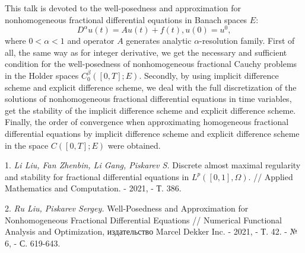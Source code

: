 




\vzmscaption



This talk is devoted to  the  well-posedness and approximation for nonhomogeneous
fractional differential equations in Banach spaces $E:$
$$ D^\alpha u(t) = A u(t) + f(t), u(0)= u^0, $$
where $0 < \alpha <1$ and operator $A$ generates analytic $\alpha$-resolution family.
 First of all, the same way
as for integer derivative, we get the necessary and sufficient condition for the
well-posedness of   nonhomogeneous fractional Cauchy problems in the Holder spaces
$C^\beta_0([0,T];E).$ Secondly, by using implicit difference scheme and
explicit  difference scheme, we deal with the full discretization of the solutions
of nonhomogeneous fractional differential equations in time variables, get the  stability
of the implicit difference scheme and
explicit difference scheme. Finally, the order of convergence when approximating
homogeneous fractional differential equations by implicit difference scheme and
explicit difference scheme in the space $C([0,T];E)$ were obtained.






1. {\it Li Liu, Fan Zhenbin, Li Gang, Piskarev S.} Discrete almost maximal regularity and stability for 
fractional differential equations in $L^p ([0, 1], \Omega).$ //  Applied Mathematics and Computation. - 2021, - Т. 386. 

2. {\it Ru Liu, Piskarev Sergey.} Well-Posedness and Approximation for Nonhomogeneous Fractional Differential Equations
// Numerical Functional Analysis and Optimization, издательство Marcel Dekker Inc. - 2021, - Т. 42. - № 6, - С. 619-643.



